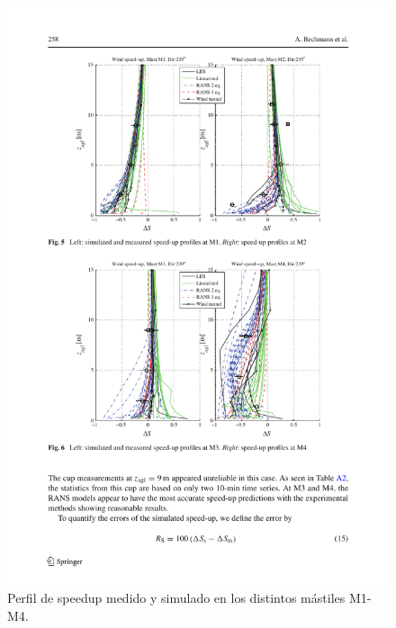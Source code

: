 \begin{figure}[H]
	\includegraphics[width=1.0\linewidth,trim={2.7cm 6.0cm 1.9cm 10.3cm},clip]{bolund3.pdf}%
	\caption{Perfil de speedup medido y simulado en los distintos mástiles M1-M4.}
	\label{fig:an1_speed_masts}
\end{figure}


